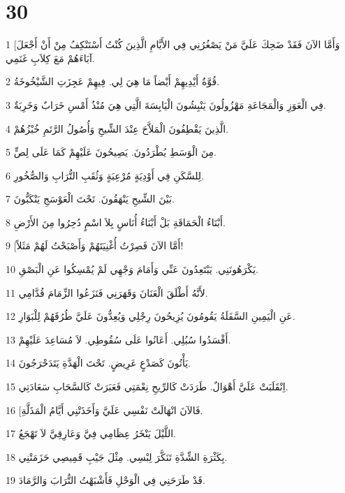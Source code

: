 \chapter{30}

\par 1 [وَأَمَّا الآنَ فَقَدْ ضَحِكَ عَلَيَّ مَنْ يَصْغُرُنِي فِي الأَيَّامِ الَّذِينَ كُنْتُ أَسْتَنْكِفُ مِنْ أَنْ أَجْعَلَ آبَاءَهُمْ مَعَ كِلاَبِ غَنَمِي.
\par 2 قُوَّةُ أَيْدِيهِمْ أَيْضاً مَا هِيَ لِي. فِيهِمْ عَجِزَتِ الشَّيْخُوخَةُ.
\par 3 فِي الْعَوَزِ وَالْمَجَاعَةِ مَهْزُولُونَ يَنْبِشُونَ الْيَابِسَةَ الَّتِي هِيَ مُنْذُ أَمْسِ خَرَابٌ وَخَرِبَةٌ.
\par 4 الَّذِينَ يَقْطِفُونَ الْمَلاَّحَ عِنْدَ الشِّيحِ وَأُصُولُ الرَّتَمِ خُبْزُهُمْ.
\par 5 مِنَ الْوَسَطِ يُطْرَدُونَ. يَصِيحُونَ عَلَيْهِمْ كَمَا عَلَى لِصٍّ.
\par 6 لِلسَّكَنِ فِي أَوْدِيَةٍ مُرْعِبَةٍ وَثُقَبِ التُّرَابِ وَالصُّخُورِ.
\par 7 بَيْنَ الشِّيحِ يَنْهَقُونَ. تَحْتَ الْعَوْسَجِ يَنْكَبُّونَ.
\par 8 أَبْنَاءُ الْحَمَاقَةِ بَلْ أَبْنَاءُ أُنَاسٍ بِلاَ اسْمٍ دُحِرُوا مِنَ الأَرْضِ.
\par 9 [أَمَّا الآنَ فَصِرْتُ أُغْنِيَتَهُمْ وَأَصْبَحْتُ لَهُمْ مَثَلاً!
\par 10 يَكْرَهُونَنِي. يَبْتَعِدُونَ عَنِّي وَأَمَامَ وَجْهِي لَمْ يُمْسِكُوا عَنِ الْبَصْقِ.
\par 11 لأَنَّهُ أَطْلَقَ الْعَنَانَ وَقَهَرَنِي فَنَزَعُوا الزِّمَامَ قُدَّامِي.
\par 12 عَنِ الْيَمِينِ السَّفَلَةُ يَقُومُونَ يُزِيحُونَ رِجْلِي وَيُعِدُّونَ عَلَيَّ طُرُقَهُمْ لِلْبَوَارِ.
\par 13 أَفْسَدُوا سُبُلِي. أَعَانُوا عَلَى سُقُوطِي. لاَ مُسَاعِدَ عَلَيْهِمْ.
\par 14 يَأْتُونَ كَصَدْعٍ عَرِيضٍ. تَحْتَ الْهَدَّةِ يَتَدَحْرَجُونَ.
\par 15 اِنْقَلَبَتْ عَلَيَّ أَهْوَالٌ. طَرَدَتْ كَالرِّيحِ نِعْمَتِي فَعَبَرَتْ كَالسَّحَابِ سَعَادَتِي.
\par 16 [فَالآنَ انْهَالَتْ نَفْسِي عَلَيَّ وَأَخَذَتْنِي أَيَّامُ الْمَذَلَّةِ.
\par 17 اللَّيْلَ يَنْخَرُ عِظَامِي فِيَّ وَعَارِقِيَّ لاَ تَهْجَعُ.
\par 18 بِكَثْرَةِ الشِّدَّةِ تَنَكَّرَ لِبْسِي. مِثْلَ جَيْبِ قَمِيصِي حَزَمَتْنِي.
\par 19 قَدْ طَرَحَنِي فِي الْوَحْلِ فَأَشْبَهْتُ التُّرَابَ وَالرَّمَادَ.
